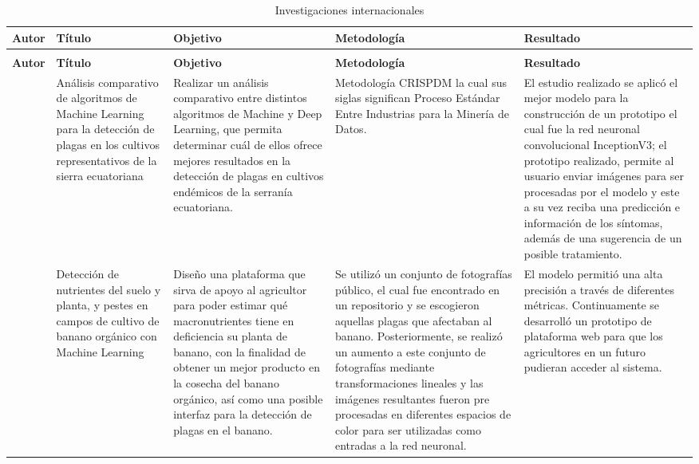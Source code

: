 \begin{longtable}{|p{2cm}|p{3cm}|p{3cm}|p{4cm}|p{3cm}|}

\caption{Investigaciones internacionales}\\
\textbf{Autor} & \textbf{Título} & \textbf{Objetivo} & \textbf{Metodología} & \textbf{Resultado} \\
\hline
\endfirsthead
  \caption[]{Investigaciones internacionales}\\
  \textbf{Autor} & \textbf{Título} & \textbf{Objetivo} & \textbf{Metodología} & \textbf{Resultado} \\
  \hline
\endhead

\citet{aimacana2021} & Análisis comparativo de algoritmos de Machine Learning para la detección de plagas en los cultivos representativos de la sierra ecuatoriana & Realizar un análisis comparativo entre distintos algoritmos de Machine y Deep Learning, que permita determinar cuál de ellos ofrece mejores resultados en la detección de plagas en cultivos endémicos de la serranía ecuatoriana. & Metodología CRISPDM la cual sus siglas significan Proceso Estándar Entre Industrias para la Minería de Datos. & El estudio realizado se aplicó el mejor modelo para la construcción de un prototipo el cual fue la red neuronal convolucional InceptionV3; el prototipo realizado, permite al usuario enviar imágenes para ser procesadas por el modelo y este a su vez reciba una predicción e información de los síntomas, además de una sugerencia de un posible tratamiento. \\
\hline
\citet{castaneda2021} & Detección de nutrientes del suelo y planta, y pestes en campos de cultivo de banano orgánico con Machine Learning & Diseño una plataforma que sirva de apoyo al agricultor para poder estimar qué macronutrientes tiene en deficiencia su planta de banano, con la finalidad de obtener un mejor producto en la cosecha del banano orgánico, así como una posible interfaz para la detección de plagas en el banano. & Se utilizó un conjunto de fotografías público, el cual fue encontrado en un repositorio y se escogieron aquellas plagas que afectaban al banano. Posteriormente, se realizó un aumento a este conjunto de fotografías mediante transformaciones lineales y las imágenes resultantes fueron pre procesadas en diferentes espacios de color para ser utilizadas como entradas a la red neuronal. & El modelo permitió una alta precisión a través de diferentes métricas. Continuamente se desarrolló un prototipo de plataforma web para que los agricultores en un futuro pudieran acceder al sistema. \\

\end{longtable}
